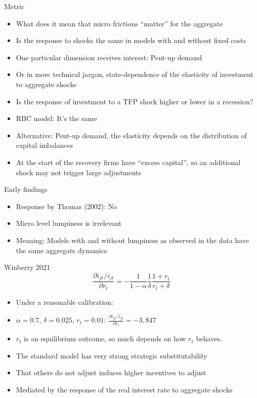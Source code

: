 \documentclass[english,xcolor=svgnames,aspectratio=169]{beamer}
\begin{document}
\begin{frame}{Metric}
\begin{itemize}
\item What does it mean that micro frictions ``matter'' for the aggregate
\item Is the response to shocks the same in models with and without fixed costs
\item One particular dimension receives interest: Pent-up demand
\item Or in more technical jargon, state-dependence of the elasticity of investment to aggregate shocks
\item Is the response of investment to a TFP shock higher or lower in a recession?
\item RBC model: It's the same
\item Alternative: Pent-up demand, the elasticity depends on the distribution of capital imbalances
\item At the start of the recovery firms have ``excess capital'', so an additional shock may not trigger large adjustments
\end{itemize}
\end{frame}

\begin{frame}{Early findings}
\begin{itemize}
\item Response by Thomas (2002): No
\item Micro level lumpiness is irrelevant 
\item Meaning: Models with and without lumpiness as observed in the data have the same aggregate dynamics
\end{itemize}
\end{frame}





\begin{frame}{Winberry 2021}
$$\frac{\partial i_{jt}/i_{jt}}{\partial r_t} = - \frac{1}{1-\alpha}\frac{1}{\delta}\frac{1+r_t}{r_t + \delta}$$
\begin{itemize}
\item Under a reasonable calibration:
\item $\alpha = 0.7$, $\delta = 0.025$, $r_t = 0.01$: $\frac{\partial i_{jt}/i_{jt}}{\partial r_t} = -3,847$
\item $r_t$ is an equilibrium outcome, so much depends on how $r_t$ behaves.
\item The standard model has very strong strategic substitutability
\item That others do not adjust induces higher incentives to adjust
\item Mediated by the response of the real interest rate to aggregate shocks
\end{itemize}
\end{frame}
\end{document}

